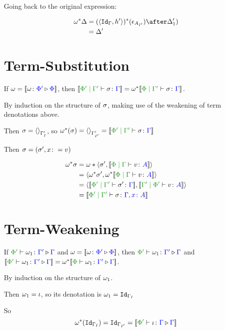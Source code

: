 \documentclass{report}
\begin{document}
Going back to the original expression:

\begin{align*}
    \w\star{\D} & = (\pr{\Id{\G}}{h'})\star(\e_{A_{I'}})\after\D_1')\\
    & = \D'\\
\end{align*}

\section{Term-Substitution}

If $\omega = {\bf [\![}\omega \colon {\color{blue}\Phi'} \triangleright {\color {blue} \Phi}{\bf ]\!]}$, then $\deno{\etyperelation{\P'}{\G'}{\si}{\G}} = \w\star\deno{\etyperelation{\P}{\G'}{\si}{\G}}$.

\proof
By induction on the structure of $\sigma$, making use of the weakening of term denotations above.

Then $\sigma = \left\langle\right\rangle_{\Gamma'_{I}}$, so $\w\star(\si) = \term{\G'_{I'}} = \deno{\etyperelation{\P'}{\G'}{\si}{\G}}$

Then $\sigma = (\sigma',x\colon= v)$

\begin{align*}
    \w\star\si & = \w*\pr{\si'}{\deno{\gpetyperelation{v}{A}}}\\
    & = \pr{\w\star\si'}{\w\star\deno{\gpetyperelation{v}{A}}}\\
    &=\pr{\deno{\etyperelation{\P'}{\G'}{\si'}{\G}}}{\deno{\etyperelation{\G'}{\P'}{v}{A}}}\\
    &=\deno{\etyperelation{\P'}{\G'}{\si}{\gax}}
\end{align*}


\section{Term-Weakening}

If $\ewrel{\P'}{\w_1}{\G'}{\G}$ and $\omega = {\bf [\![}\omega \colon {\color{blue}\Phi'} \triangleright {\color {blue} \Phi}{\bf ]\!]}$, then $\ewrel{\P'}{\w_1}{\G'}{\G}$ and $\deno{\ewrel{\P'}{\w_1}{\G'}{\G}} = \w\star\deno{\ewrel{\P}{\w_1}{\G'}{\G}}$.


\proof
By induction on the structure of $\omega_1$.

Then $\omega_1 = \iota$, so its denotation is $\omega_1 = \texttt{Id}_{\Gamma_I}$

So
\begin{equation}
  \w\star(\Id{\G_I}) = \Id{\G_{I'}} = \deno{\ewrel{\P'}{\i}{\G}{\G}}  
\end{equation}
\end{document}
